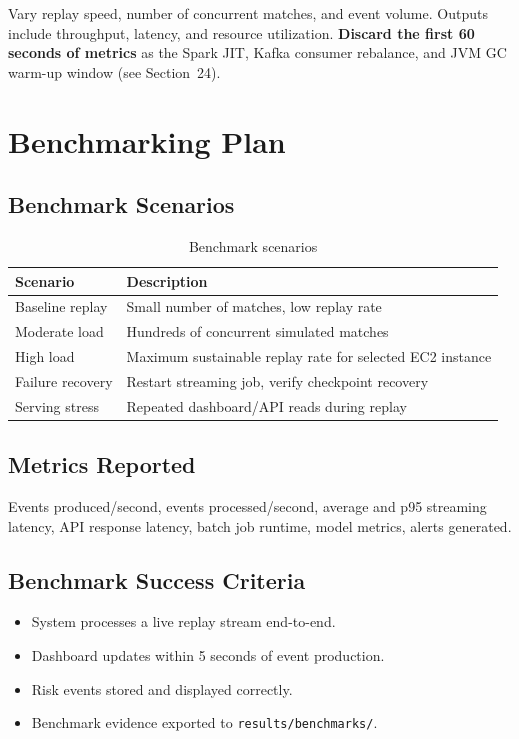 \documentclass[11pt,a4paper]{article}
\begin{document}
Vary replay speed, number of concurrent matches, and event volume. Outputs include throughput,
latency, and resource utilization. \textbf{Discard the first 60 seconds of metrics} as the
Spark JIT, Kafka consumer rebalance, and JVM GC warm-up window (see Section~24).

\section{Benchmarking Plan}

\subsection{Benchmark Scenarios}

\begin{table}[H]
\centering
\begin{tabularx}{\linewidth}{L{4cm}X}
\toprule
\textbf{Scenario} & \textbf{Description} \\
\midrule
Baseline replay & Small number of matches, low replay rate \\
Moderate load & Hundreds of concurrent simulated matches \\
High load & Maximum sustainable replay rate for selected EC2 instance \\
Failure recovery & Restart streaming job, verify checkpoint recovery \\
Serving stress & Repeated dashboard/API reads during replay \\
\bottomrule
\end{tabularx}
\caption{Benchmark scenarios}
\end{table}

\subsection{Metrics Reported}

Events produced/second, events processed/second, average and p95 streaming latency, API response
latency, batch job runtime, model metrics, alerts generated.

\subsection{Benchmark Success Criteria}

\begin{itemize}[nosep]
  \item System processes a live replay stream end-to-end.
  \item Dashboard updates within 5 seconds of event production.
  \item Risk events stored and displayed correctly.
  \item Benchmark evidence exported to \texttt{results/benchmarks/}.
\end{itemize}
\end{document}
